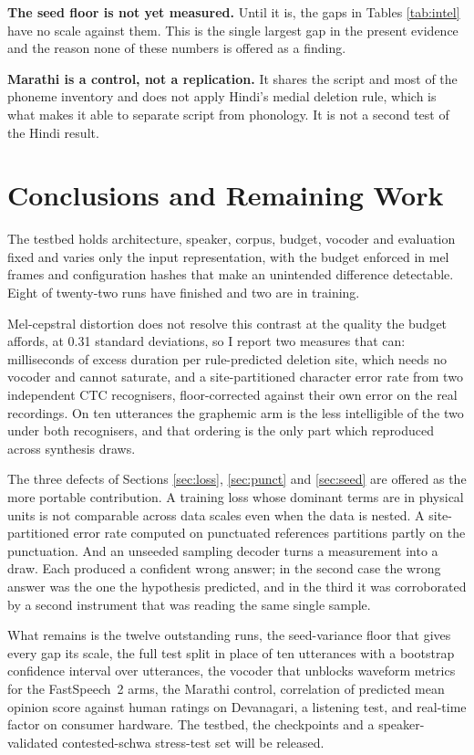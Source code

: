 \documentclass[runningheads]{llncs}
\begin{document}
\textbf{The seed floor is not yet measured.} Until it is, the gaps in Tables
\ref{tab:intel} have no scale against them. This is the
single largest gap in the present evidence and the reason none of these
numbers is offered as a finding.

\textbf{Marathi is a control, not a replication.} It shares the script and
most of the phoneme inventory \cite{ohala1999hindi, dhongde2009marathi} and
does not apply Hindi's medial deletion rule, which is what makes it able to
separate script from phonology. It is not a second test of the Hindi result.

\section{Conclusions and Remaining Work}

The testbed holds architecture, speaker, corpus, budget, vocoder and
evaluation fixed and varies only the input representation, with the budget
enforced in mel frames and configuration hashes that make an unintended
difference detectable. Eight of twenty-two runs have finished and two are in
training.

Mel-cepstral distortion does not resolve this contrast at the quality the
budget affords, at 0.31 standard deviations, so I report two measures that
can: milliseconds of excess duration per rule-predicted deletion site, which
needs no vocoder and cannot saturate, and a site-partitioned character error
rate from two independent CTC recognisers, floor-corrected against their own
error on the real recordings. On ten utterances the graphemic arm is the less
intelligible of the two under both recognisers, and that ordering is the only
part which reproduced across synthesis draws.

The three defects of Sections \ref{sec:loss}, \ref{sec:punct} and
\ref{sec:seed} are offered as the more portable contribution. A training loss
whose dominant terms are in physical units is not comparable across data
scales even when the data is nested. A site-partitioned error rate computed on
punctuated references partitions partly on the punctuation. And an unseeded
sampling decoder turns a measurement into a draw. Each produced a confident
wrong answer; in the second case the wrong answer was the one the hypothesis
predicted, and in the third it was corroborated by a second instrument that
was reading the same single sample.

What remains is the twelve outstanding runs, the seed-variance floor that
gives every gap its scale, the full test split in place of ten utterances with
a bootstrap confidence interval over utterances, the vocoder that unblocks
waveform metrics for the FastSpeech~2 arms, the Marathi control, correlation
of predicted mean opinion score against human ratings on Devanagari, a
listening test, and real-time factor on consumer hardware. The testbed, the
checkpoints and a speaker-validated contested-schwa stress-test set will be
released.
\end{document}
